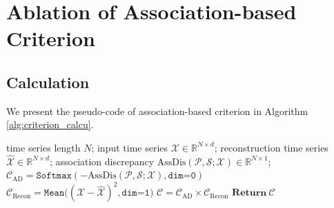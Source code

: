 \documentclass{article} %
\begin{document}
\section{Ablation of Association-based Criterion}\label{sec:app_criterion}
\subsection{Calculation}
We present the pseudo-code of association-based criterion in Algorithm \ref{alg:criterion_calcu}. 
\begin{algorithm*}[hbp]
  \caption{Association-based Criterion $\texttt{AnomalyScore}(\mathcal{X})$ Calculation}
  \label{alg:criterion_calcu}
  \begin{algorithmic}[1]
    \Require  
   time series length $N$; input time series $\mathcal{X}\in\mathbb{R}^{N\times d}$; reconstruction time series ${\widehat{\mathcal{X}}}\in\mathbb{R}^{N\times d}$; association discrepancy $\mathrm{AssDis}(\mathcal{P},\mathcal{S};\mathcal{X})\in\mathbb{R}^{N\times 1}$;
    \State $\mathcal{C}_{\text{AD}}=\texttt{Softmax}(  -\mathrm{AssDis}(\mathcal{P},\mathcal{S};\mathcal{X}), \texttt{dim=0})$ 
    \State $\mathcal{C}_{\text{Recon}}=\texttt{Mean}\Big((\mathcal{X}-{\widehat{\mathcal{X}}})^2, \texttt{dim=1}\Big)$ 
    \State $\mathcal{C}=\mathcal{C}_{\text{AD}}\times \mathcal{C}_{\text{Recon}}$ 
    \State $\textbf{Return}\ \mathcal{C}$
  \end{algorithmic}  
\end{algorithm*}
\end{document}
